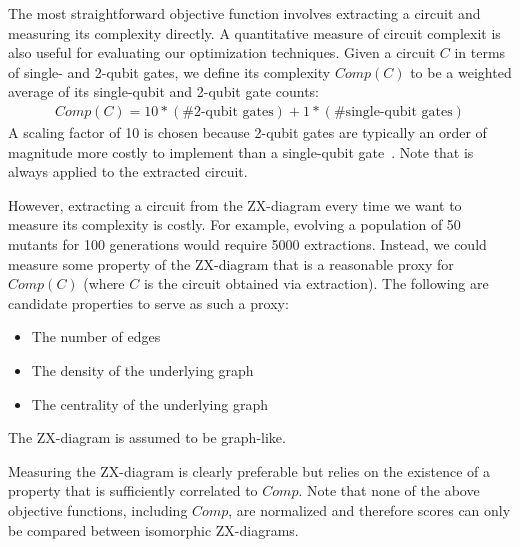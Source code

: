 The most straightforward objective function involves extracting a circuit and measuring its complexity directly.
A quantitative measure of circuit complexit is also useful for evaluating our optimization techniques.
Given a circuit $C$ in terms of single- and 2-qubit gates, we define its complexity $Comp(C)$ to be a weighted average of its single-qubit and 2-qubit gate counts:
\begin{align*}
  Comp(C) = 10 * (\text{\# 2-qubit gates}) + 1 * (\text{\# single-qubit gates})
\end{align*}
A scaling factor of 10 is chosen because 2-qubit gates are typically an order of magnitude more costly to implement than a single-qubit gate~\cite{campbell2017roads, ballance2016high}.
Note that  is always applied to the extracted circuit.


However, extracting a circuit from the ZX-diagram every time we want to measure its complexity is costly.
For example, evolving a population of 50 mutants for 100 generations would require 5000 extractions.
Instead, we could measure some property of the ZX-diagram that is a reasonable proxy for $Comp(C)$ (where $C$ is the circuit obtained via extraction).
The following are candidate properties to serve as such a proxy:
\begin{itemize}
\item
  The number of edges
\item
  The density of the underlying graph
\item
  The centrality of the underlying graph
\end{itemize}
The ZX-diagram is assumed to be graph-like.

Measuring the ZX-diagram is clearly preferable but relies on the existence of a property that is sufficiently correlated to $Comp$.
Note that none of the above objective functions, including $Comp$, are normalized and therefore scores can only be compared between isomorphic ZX-diagrams.

